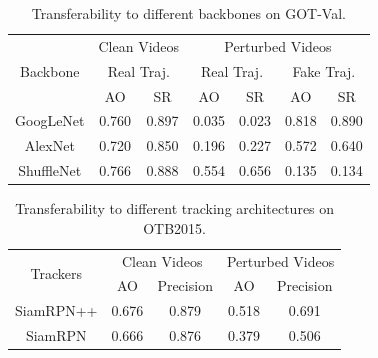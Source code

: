 \documentclass[journal]{IEEEtran}
\begin{document}
\begin{table}
\centering
\caption{Transferability to different backbones on GOT-Val.}
\begin{tabular}{c|cc|cc|cc} 
\toprule
\multirow{3}{*}[-6pt]{Backbone} & \multicolumn{2}{c|}{Clean Videos}    & \multicolumn{4}{c}{Perturbed Videos}                                        \\ 
\cmidrule{2-7}
                          & \multicolumn{2}{c|}{Real Traj.} & \multicolumn{2}{c|}{Real Traj.} & \multicolumn{2}{c}{Fake Traj.}  \\ 
\cmidrule{2-7}
                          & AO    & SR                           & AO    & SR                           & AO    & SR                           \\ 
\midrule
GoogLeNet                 & 0.760 & 0.897                        & 0.035 & 0.023                        & 0.818 & 0.890                        \\
AlexNet                   & 0.720 & 0.850                        & 0.196 & 0.227                        & 0.572 & 0.640                        \\
ShuffleNet                & 0.766 & 0.888                        & 0.554 & 0.656                        & 0.135 & 0.134                        \\
\bottomrule
\end{tabular}
\label{tab:backbone}
\end{table}

\begin{table}
\centering
\caption{Transferability to different tracking architectures on OTB2015.}
\begin{tabular}{c|cc|cc} 
\toprule
\multirow{2}{*}[-2pt]{Trackers} & \multicolumn{2}{c|}{Clean Videos} & \multicolumn{2}{c}{Perturbed Videos}  \\
\cmidrule{2-5}
                          & AO & Precision              & AO & Precision                   \\
\midrule
SiamRPN++                 & 0.676   & 0.879                  & 0.518   & 0.691                       \\
SiamRPN                   & 0.666   & 0.876                  & 0.379   & 0.506                       \\
\bottomrule
\end{tabular}
\label{tab:arch}
\end{table}
\end{document}
